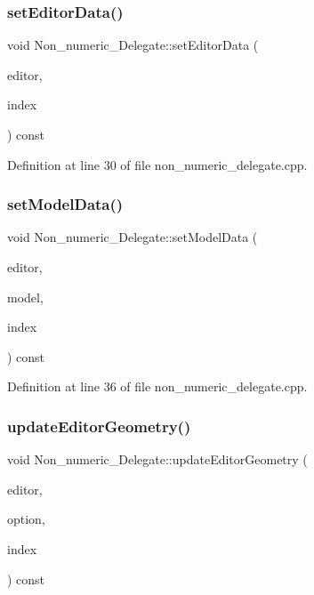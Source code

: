 \subsubsection{\texorpdfstring{set\+Editor\+Data()}{setEditorData()}}
{\footnotesize\ttfamily void Non\+\_\+numeric\+\_\+\+Delegate\+::set\+Editor\+Data (\begin{DoxyParamCaption}\item[{Q\+Widget $\ast$}]{editor,  }\item[{const Q\+Model\+Index \&}]{index }\end{DoxyParamCaption}) const}



Definition at line 30 of file non\+\_\+numeric\+\_\+delegate.\+cpp.

\mbox{\label{classNon__numeric__Delegate_a517cb55e57c8a6c86eee133141f7b6cb}} 
\subsubsection{\texorpdfstring{set\+Model\+Data()}{setModelData()}}
{\footnotesize\ttfamily void Non\+\_\+numeric\+\_\+\+Delegate\+::set\+Model\+Data (\begin{DoxyParamCaption}\item[{Q\+Widget $\ast$}]{editor,  }\item[{Q\+Abstract\+Item\+Model $\ast$}]{model,  }\item[{const Q\+Model\+Index \&}]{index }\end{DoxyParamCaption}) const}



Definition at line 36 of file non\+\_\+numeric\+\_\+delegate.\+cpp.

\mbox{\label{classNon__numeric__Delegate_ac5d634e38c5445a0c9220008840488b9}} 
\subsubsection{\texorpdfstring{update\+Editor\+Geometry()}{updateEditorGeometry()}}
{\footnotesize\ttfamily void Non\+\_\+numeric\+\_\+\+Delegate\+::update\+Editor\+Geometry (\begin{DoxyParamCaption}\item[{Q\+Widget $\ast$}]{editor,  }\item[{const Q\+Style\+Option\+View\+Item \&}]{option,  }\item[{const Q\+Model\+Index \&}]{index }\end{DoxyParamCaption}) const}



